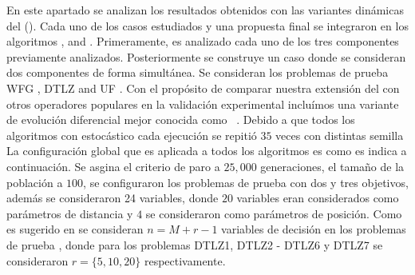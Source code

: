 En este apartado se analizan los resultados obtenidos con las variantes dinámicas del \SBX{} (\DSBX{}).
%
Cada uno de los casos estudiados y una propuesta final se integraron en los algoritmos \NSGAII{}, \MOEAD{} and \SMSEMOA{}.
%
Primeramente, es analizado cada uno de los tres componentes previamente analizados.
%
Posteriormente se construye un caso donde se consideran dos componentes de forma simultánea.
%
Se consideran los problemas de prueba WFG \cite{Joel:WFG}, DTLZ \cite{Joel:DTLZ_2} and UF \cite{zhang2009performance}.
%
Con el propósito de comparar nuestra extensión del \SBX{} con otros operadores populares en la validación experimental incluímos una variante de evolución diferencial mejor conocida como \DEMO{}~\cite{tuvsar2007differential}.
Debido a que todos los algoritmos con estocástico cada ejecución se repitió $35$ veces con distintas semilla 
%
La configuración global que es aplicada a todos los algoritmos es como es indica a continuación.
%
Se asgina el criterio de paro a $25,000$ generaciones, el tamaño de la población a $100$, se configuraron los problemas de prueba \WFG{} con dos y tres objetivos, además se consideraron 24 variables, donde $20$ variables eran considerados como parámetros de distancia y $4$ se consideraron como parámetros de posición.
%
Como es sugerido en \cite{Joel:DTLZ_2} se consideran $n=M+r-1$ variables de decisión en los problemas de prueba \DTLZ{}, donde para los problemas DTLZ1, DTLZ2 - DTLZ6 y DTLZ7 se consideraron $r=\{5, 10, 20\}$  respectivamente.

